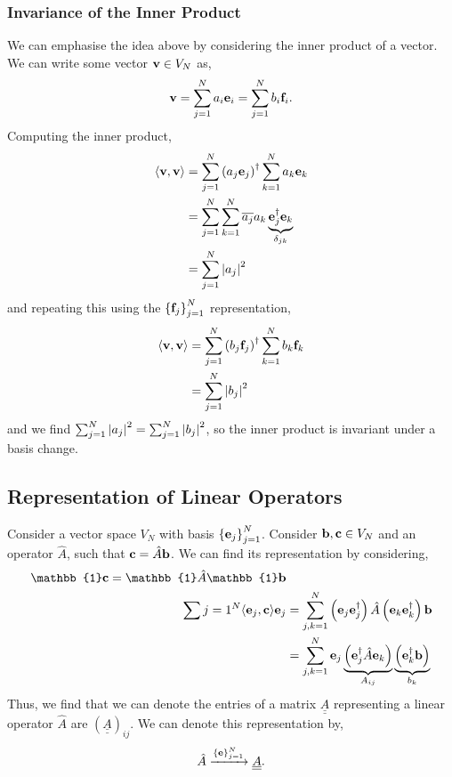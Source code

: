 \documentclass{book}
\def\innerproduct#1#2{\langle#1,#2\rangle}
\def\doubleunderline#1{\underline{\underline{#1}}}
\begin{document}
\subsubsection{Invariance of the Inner Product}
We can emphasise the idea above by considering the inner product of a vector. We can write some vector $\vb{v}\in V_N$ as,
\begin{equation}
	\vb{v} = \sum_{j=1}^Na_i\vb{e}_i = \sum_{j=1}^N b_i\vb{f}_i.
\end{equation}
Computing the inner product,
\begin{equation}
	\begin{split}
	\innerproduct{\vb{v}}{\vb{v}} & = \sum_{j=1}^N\left(a_j\vb{e}_j\right)^{\dag}\sum_{k=1}^Na_k\vb{e}_k \\
	& = \sum_{j=1}^N\sum_{k=1}^N\overline{a_j}a_k\underbrace{\vb{e}_j^{\dag}\vb{e}_k}_{\delta_{jk}} \\
	& = \sum_{j=1}^N\abs{a_j}^2
	\end{split}
\end{equation}
and repeating this using the $\left\{\vb{f}_j\right\}_{j=1}^N$ representation,
\begin{equation}
	\begin{split}
		\innerproduct{\vb{v}}{\vb{v}} & = \sum_{j=1}^N\left(b_j\vb{f}_j\right)^{\dag}\sum_{k=1}^Nb_k\vb{f}_k \\
		& = \sum_{j=1}^N\abs{b_j}^2
	\end{split}
\end{equation}
and we find $\sum_{j=1}^N\abs{a_j}^2 = \sum_{j=1}^N\abs{b_j}^2$, so the inner product is invariant under a basis change.
\subsection{Representation of Linear Operators}
Consider a vector space $V_N$ with basis $\left\{\vb{e}_j\right\}_{j=1}^N$. Consider $\vb{b},\vb{c} \in V_N$ and an operator $\hat{A}$, such that $\vb{c} = \hat{A}\vb{b}$. We can find its representation by considering,
\begin{equation}
	\begin{split}
		\mathbb{1} \vb{c} = \mathbb{1} \hat{A}\mathbb{1}\vb{b} & \\
		\sum{j=1}^N \innerproduct{\vb{e}_j}{\vb{c}} \vb{e}_j & = \sum_{j,k=1}^N\left(\vb{e}_j\vb{e}_j^{\dag}\right)\hat{A}\left(\vb{e}_k\vb{e}_k^{\dag}\right)\vb{b} \\
		& = \sum_{j,k=1}^N \vb{e}_j\underbrace{\left(\vb{e}_j^{\dag}\hat{A}\vb{e}_k\right)}_{A_{ij}}\underbrace{\left(\vb{e}_k^{\dag}\vb{b}\right)}_{b_k}
	\end{split}
\end{equation}
Thus, we find that we can denote the entries of a matrix $\doubleunderline{A}$ representing a linear operator $\hat{A}$ are $\left(\doubleunderline{A}\right)_{ij}$. We can denote this representation by,
\begin{align}
	\hat{A} \xrightarrow{\left\{\vb{e}\right\}_{j=1}^N} \doubleunderline{A}.
\end{align}
\end{document}

